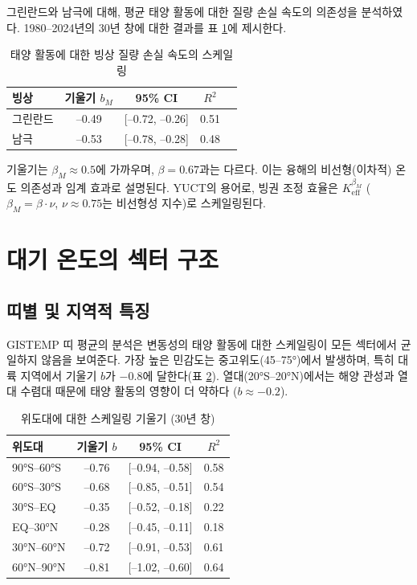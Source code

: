 \documentclass[11pt,a4paper]{article}
\newcommand{\Keff}{K_{\mathrm{eff}}}
\newcommand{\be}{\beta}
\begin{document}
	그린란드와 남극에 대해, 평균 태양 활동에 대한 질량 손실 속도의 의존성을 분석하였다. 1980–2024년의 30년 창에 대한 결과를 표 \ref{tab:icescaling}에 제시한다.
	
	\begin{table}[htbp]
		\centering
		\caption{태양 활동에 대한 빙상 질량 손실 속도의 스케일링}
		\label{tab:icescaling}
		\begin{tabular}{@{}lcccc@{}}
			\toprule
			빙상 & 기울기 $b_M$ & 95\% CI & $R^2$ \\
			\midrule
			그린란드 & –0.49 & [–0.72, –0.26] & 0.51 \\
			남극     & –0.53 & [–0.78, –0.28] & 0.48 \\
			\bottomrule
		\end{tabular}
	\end{table}
	
	기울기는 $\beta_M \approx 0.5$에 가까우며, $\be = 0.67$과는 다르다. 이는 융해의 비선형(이차적) 온도 의존성과 임계 효과로 설명된다. YUCT의 용어로, 빙권 조정 효율은 $\Keff^{\beta_M}$ ($\beta_M = \be \cdot \nu$, $\nu \approx 0.75$는 비선형성 지수)로 스케일링된다.
	
	\section{대기 온도의 섹터 구조}
	
	\subsection{띠별 및 지역적 특징}
	
	GISTEMP 띠 평균의 분석은 변동성의 태양 활동에 대한 스케일링이 모든 섹터에서 균일하지 않음을 보여준다. 가장 높은 민감도는 중고위도(45–75°)에서 발생하며, 특히 대륙 지역에서 기울기 $b$가 $-0.8$에 달한다(표 \ref{tab:zonal}). 열대(20°S–20°N)에서는 해양 관성과 열대 수렴대 때문에 태양 활동의 영향이 더 약하다 ($b \approx -0.2$).
	
	\begin{table}[htbp]
		\centering
		\caption{위도대에 대한 스케일링 기울기 (30년 창)}
		\label{tab:zonal}
		\begin{tabular}{@{}lccc@{}}
			\toprule
			위도대 & 기울기 $b$ & 95\% CI & $R^2$ \\
			\midrule
			90°S–60°S & –0.76 & [–0.94, –0.58] & 0.58 \\
			60°S–30°S & –0.68 & [–0.85, –0.51] & 0.54 \\
			30°S–EQ   & –0.35 & [–0.52, –0.18] & 0.22 \\
			EQ–30°N   & –0.28 & [–0.45, –0.11] & 0.18 \\
			30°N–60°N & –0.72 & [–0.91, –0.53] & 0.61 \\
			60°N–90°N & –0.81 & [–1.02, –0.60] & 0.64 \\
			\bottomrule
		\end{tabular}
	\end{table}
	
\end{document}
